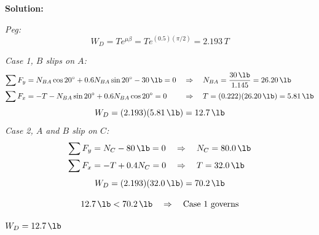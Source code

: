 \documentclass[11pt]{article}
\begin{document}
\textbf{Solution:}

\textit{Peg:}
\[
    W_D = Te^{\mu\beta} = Te^{(0.5)(\pi/2)} = 2.193\,T
\]

\textit{Case 1, $B$ slips on $A$:}
\begin{align*}
    \sum F_y &= N_{BA}\cos 20^\circ + 0.6N_{BA}\sin 20^\circ - \SI{30}{\lb} = 0 &&\Rightarrow\quad N_{BA} = \frac{\SI{30}{\lb}}{1.145} = \SI{26.20}{\lb} \\
    \sum F_x &= -T - N_{BA}\sin 20^\circ + 0.6N_{BA}\cos 20^\circ = 0 &&\Rightarrow\quad T = (0.222)(\SI{26.20}{\lb}) = \SI{5.81}{\lb}
\end{align*}
\[
    W_D = (2.193)(\SI{5.81}{\lb}) = \SI{12.7}{\lb}
\]
\textit{Case 2, $A$ and $B$ slip on $C$:}
\begin{align*}
    \sum F_y &= N_C - \SI{80}{\lb} = 0 &&\Rightarrow\quad N_C = \SI{80.0}{\lb} \\
    \sum F_x &= -T + 0.4N_C = 0 &&\Rightarrow\quad T = \SI{32.0}{\lb}
\end{align*}
\[
    W_D = (2.193)(\SI{32.0}{\lb}) = \SI{70.2}{\lb}
\]

\[
    \SI{12.7}{\lb} < \SI{70.2}{\lb} \quad\Rightarrow\quad \text{Case 1 governs}
\]

\begin{finalanswer}
    $W_D = \SI{12.7}{\lb}$
\end{finalanswer}
\end{document}
